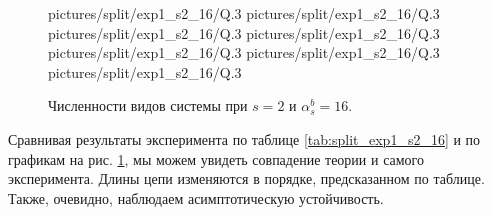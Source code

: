 \begin{figure}[H]
    \centering
       {pictures/split/exp1_s2_16/Q}{.3}
      {pictures/split/exp1_s2_16/Q}{.3}
      {pictures/split/exp1_s2_16/Q}{.3}
      {pictures/split/exp1_s2_16/Q}{.3}
      {pictures/split/exp1_s2_16/Q}{.3}
      {pictures/split/exp1_s2_16/Q}{.3}
      {pictures/split/exp1_s2_16/Q}{.3}
\caption{Численности видов системы при \(s=2\) и \(\alpha^b_s = 16\).} \label{fig:split_exp1_s2_16}
\end{figure}
Сравнивая результаты эксперимента по таблице \ref{tab:split_exp1_s2_16} и по графикам на рис. \ref{fig:split_exp1_s2_16}, мы можем увидеть совпадение теории и самого эксперимента. Длины цепи изменяются в порядке, предсказанном по таблице. Также, очевидно, наблюдаем асимптотическую устойчивость.

